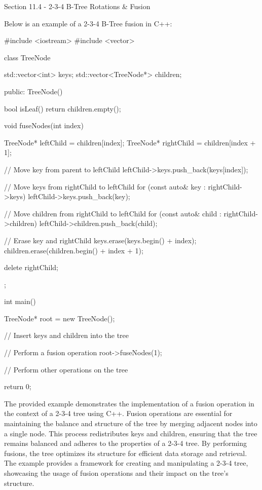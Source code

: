 \begin{notes}{Section 11.4 - 2-3-4 B-Tree Rotations \& Fusion}
    \begin{highlight}
        Below is an example of a 2-3-4 B-Tree fusion in C++:
    
        \begin{code}[C++]
        #include <iostream>
        #include <vector>
        
        class TreeNode {
            std::vector<int> keys;
            std::vector<TreeNode*> children;
        
        public:
            TreeNode() {}
        
            bool isLeaf() {
                return children.empty();
            }
        
            void fuseNodes(int index) {
                TreeNode* leftChild = children[index];
                TreeNode* rightChild = children[index + 1];
        
                // Move key from parent to leftChild
                leftChild->keys.push_back(keys[index]);
        
                // Move keys from rightChild to leftChild
                for (const auto& key : rightChild->keys) {
                    leftChild->keys.push_back(key);
                }
        
                // Move children from rightChild to leftChild
                for (const auto& child : rightChild->children) {
                    leftChild->children.push_back(child);
                }
        
                // Erase key and rightChild
                keys.erase(keys.begin() + index);
                children.erase(children.begin() + index + 1);
        
                delete rightChild;
            }
        };
        
        int main() {
            TreeNode* root = new TreeNode();
        
            // Insert keys and children into the tree
        
            // Perform a fusion operation
            root->fuseNodes(1);
        
            // Perform other operations on the tree
        
            return 0;
        }        
        \end{code}
        The provided example demonstrates the implementation of a fusion operation in the context of a 2-3-4 tree using C++. Fusion operations are essential for maintaining the balance and structure of the tree by merging adjacent nodes into a single node. This process redistributes keys and children, ensuring that the tree remains 
        balanced and adheres to the properties of a 2-3-4 tree. By performing fusions, the tree optimizes its structure for efficient data storage and retrieval. The example provides a framework for creating and manipulating a 2-3-4 tree, showcasing the usage of fusion operations and their impact on the tree's structure.
    \end{highlight}
\end{notes}

